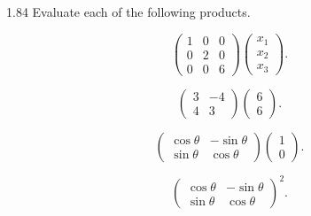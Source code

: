 \documentclass[11pt,oneside]{article}
\begin{document}
\begin{problem}{1.84}
Evaluate each of the following products.
\begin{problemsubparts}
    \item
    \[
        \begin{pmatrix}
            1&0&0\\
            0&2&0\\
            0&0&6
        \end{pmatrix}
        \begin{pmatrix}
            x_1\\x_2\\x_3
        \end{pmatrix}.
    \]
    \item
    \[
        \begin{pmatrix}
            3&-4\\
            4&3
        \end{pmatrix}
        \begin{pmatrix}
            6\\6
        \end{pmatrix}.
    \]
    \item
    \[
        \begin{pmatrix}
            \cos\theta&-\sin\theta\\
            \sin\theta&\cos\theta
        \end{pmatrix}
        \begin{pmatrix}
            1\\0
        \end{pmatrix}.
    \]
    \item
    \[
        \begin{pmatrix}
            \cos\theta&-\sin\theta\\
            \sin\theta&\cos\theta
        \end{pmatrix}^{2}.
    \]
\end{problemsubparts}
\end{problem}
\end{document}
